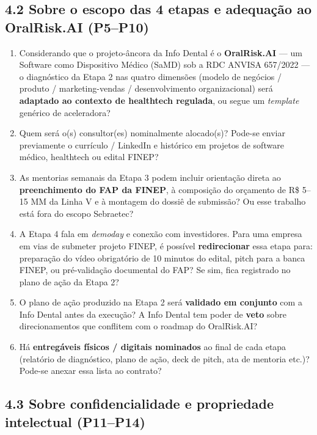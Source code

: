 \documentclass[11pt, a4paper]{article}
\begin{document}
\subsection{4.2 Sobre o escopo das 4 etapas e adequação ao OralRisk.AI (P5--P10)}

\begin{enumerate}[label=\textcolor{primaryColor}{\textbf{P\arabic*.}}, leftmargin=2.2em, start=5]
    \item Considerando que o projeto-âncora da Info Dental é o \textbf{OralRisk.AI} --- um Software como Dispositivo Médico (SaMD) sob a RDC ANVISA 657/2022 --- o diagnóstico da Etapa 2 nas quatro dimensões (modelo de negócios / produto / marketing-vendas / desenvolvimento organizacional) será \textbf{adaptado ao contexto de healthtech regulada}, ou segue um \textit{template} genérico de aceleradora?
    \item Quem será o(s) consultor(es) nominalmente alocado(s)? Pode-se enviar previamente o currículo / LinkedIn e histórico em projetos de software médico, healthtech ou edital FINEP?
    \item As mentorias semanais da Etapa 3 podem incluir orientação direta ao \textbf{preenchimento do FAP da FINEP}, à composição do orçamento de R\$ 5--15 MM da Linha V e à montagem do dossiê de submissão? Ou esse trabalho está fora do escopo Sebraetec?
    \item A Etapa 4 fala em \textit{demoday} e conexão com investidores. Para uma empresa em vias de submeter projeto FINEP, é possível \textbf{redirecionar} essa etapa para: preparação do vídeo obrigatório de 10 minutos do edital, pitch para a banca FINEP, ou pré-validação documental do FAP? Se sim, fica registrado no plano de ação da Etapa 2?
    \item O plano de ação produzido na Etapa 2 será \textbf{validado em conjunto} com a Info Dental antes da execução? A Info Dental tem poder de \textbf{veto} sobre direcionamentos que conflitem com o roadmap do OralRisk.AI?
    \item Há \textbf{entregáveis físicos / digitais nominados} ao final de cada etapa (relatório de diagnóstico, plano de ação, deck de pitch, ata de mentoria etc.)? Pode-se anexar essa lista ao contrato?
\end{enumerate}

\subsection{4.3 Sobre confidencialidade e propriedade intelectual (P11--P14)}
\end{document}
